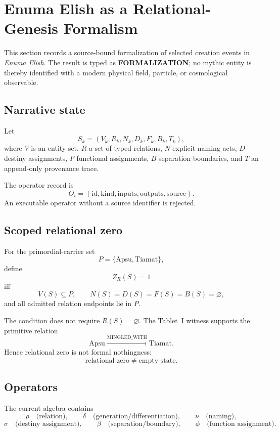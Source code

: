 \section{Enuma Elish as a Relational-Genesis Formalism}
\label{sec:enuma-relational}

This section records a source-bound formalization of selected creation events
in \emph{Enuma Elish}.  The result is typed as \textbf{FORMALIZATION}; no
mythic entity is thereby identified with a modern physical field, particle, or
cosmological observable.

\subsection{Narrative state}

Let
\[
S_k=(V_k,R_k,N_k,D_k,F_k,B_k,T_k),
\]
where $V$ is an entity set, $R$ a set of typed relations, $N$ explicit naming
acts, $D$ destiny assignments, $F$ functional assignments, $B$ separation
boundaries, and $T$ an append-only provenance trace.

The operator record is
\[
O_i=(\mathrm{id},\mathrm{kind},\mathrm{inputs},
\mathrm{outputs},\mathrm{source}).
\]
An executable operator without a source identifier is rejected.

\subsection{Scoped relational zero}

For the primordial-carrier set
\[
P=\{\mathrm{Apsu},\mathrm{Tiamat}\},
\]
define
\[
Z_R(S)=1
\]
iff
\[
V(S)\subseteq P,
\qquad
N(S)=D(S)=F(S)=B(S)=\varnothing,
\]
and all admitted relation endpoints lie in $P$.

The condition does not require $R(S)=\varnothing$.  The Tablet~I witness
supports the primitive relation
\[
\mathrm{Apsu}
\xrightarrow{\mathrm{MINGLED\_WITH}}
\mathrm{Tiamat}.
\]
Hence relational zero is not formal nothingness:
\[
\boxed{\text{relational zero}\neq\text{empty state}.}
\]

\subsection{Operators}

The current algebra contains
\[
\rho\quad\text{(relation)},\qquad
\delta\quad\text{(generation/differentiation)},\qquad
\nu\quad\text{(naming)},
\]
\[
\sigma\quad\text{(destiny assignment)},\qquad
\beta\quad\text{(separation/boundary)},\qquad
\phi\quad\text{(function assignment)}.
\]

